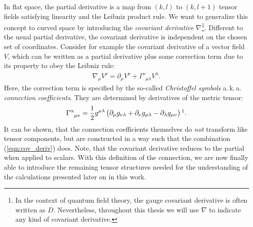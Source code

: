 In flat space, the partial derivative is a map from $(k, l)$ to $(k, l+1)$ tensor fields satisfying linearity and the Leibniz product rule. We want to generalize this concept to curved space by introducing the \textit{covariant derivative} $\nabla$\footnote{In the context of quantum field theory, the gauge covariant derivative is often written as $D$. Nevertheless, throughout this thesis we will use $\nabla$ to indicate any kind of covariant derivative.}. Different to the usual partial derivative, the covariant derivative is independent on the chosen set of coordinates. Consider for example the covariant derivative of a vector field $V$, which can be written as a partial derivative plus some correction term due to its property to obey the Leibniz rule:
\begin{align}
\nabla_{\mu} V^{\nu}=\partial_{\mu} V^{\nu}+\Gamma_{\phantom{\nu}\mu \lambda}^{\nu} V^{\lambda}.
\label{eqn:cov_deriv}
\end{align}
Here, the correction term is specified by the so-called \textit{Christoffel symbols} a.\,k.\,a. \textit{connection coefficients}. They are determined by derivatives of the metric tensor:  
\begin{align}
\Gamma_{\phantom{\alpha}\mu \nu}^{\alpha}=\frac{1}{2} g^{\mu \lambda}\left(\partial_{\mu} g_{\nu \lambda}+\partial_{\nu} g_{\mu \lambda}-\partial_{\lambda} g_{\mu \nu}\right)\footnotemark.	
\end{align}
It can be shown, that the connection coefficients themselves do \textit{not} transform like tensor components, but are constructed in a way such that the combination (\ref{eqn:cov_deriv}) does. Note, that the covariant derivative reduces to the partial when applied to scalars. With this definition of the connection, we are now finally able to introduce the remaining tensor structures needed for the understanding of the calculations presented later on in this work. \\
